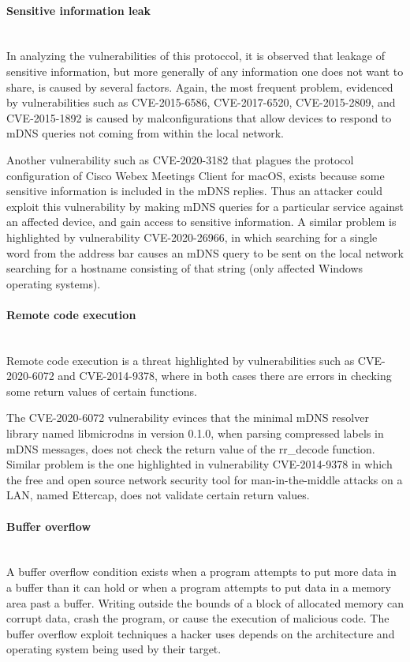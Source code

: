 \documentclass[fleqn, 11pt]{SelfArx} %
\begin{document}
\paragraph{Sensitive information leak}\mbox{}\\
In analyzing the vulnerabilities of this protoccol, it is observed that leakage of sensitive information, but more generally of any information one does not want to share, is caused by several factors. Again, the most frequent problem, evidenced by vulnerabilities such as CVE-2015-6586, CVE-2017-6520, CVE-2015-2809, and CVE-2015-1892 is caused by malconfigurations that allow devices to respond to mDNS queries not coming from within the local network. 

Another vulnerability such as CVE-2020-3182 that plagues the protocol configuration of Cisco Webex Meetings Client for macOS, exists because some sensitive information is included in the mDNS replies. Thus an attacker could exploit this vulnerability by making mDNS queries for a particular service against an affected device, and gain access to sensitive information. A similar problem is highlighted by vulnerability CVE-2020-26966, in which searching for a single word from the address bar causes an mDNS query to be sent on the local network searching for a hostname consisting of that string (only affected Windows operating systems).
\paragraph{Remote code execution}\mbox{}\\
Remote code execution is a threat highlighted by vulnerabilities such as CVE-2020-6072 and CVE-2014-9378, where in both cases there are errors in checking some return values of certain functions. 

The CVE-2020-6072 vulnerability evinces that the minimal mDNS resolver library named libmicrodns in version 0.1.0, when parsing compressed labels in mDNS messages, does not check the return value of the rr\_decode function. 
Similar problem is the one highlighted in vulnerability CVE-2014-9378 in which the free and open source network security tool for man-in-the-middle attacks on a LAN, named Ettercap, does not validate certain return values.

\paragraph{Buffer overflow}\mbox{}\\
A buffer overflow condition exists when a program attempts to put more data in a buffer than it can hold or when a program attempts to put data in a memory area past a buffer. Writing outside the bounds of a block of allocated memory can corrupt data, crash the program, or cause the execution of malicious code. The buffer overflow exploit techniques a hacker uses depends on the architecture and operating system being used by their target. 
\end{document}
